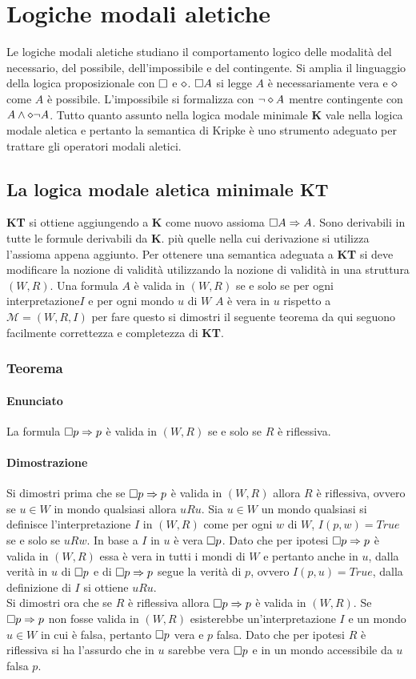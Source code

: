 \chapter{Logiche modali aletiche}
Le logiche modali aletiche studiano il comportamento logico delle modalit\`a del necessario, del possibile, dell'impossibile e del contingente. Si amplia il linguaggio della logica proposizionale con $\Box$ e 
$\diamond$. $\Box A$ si legge $A$ \`e necessariamente vera e $\diamond$ come $A$ \`e possibile. L'impossibile si formalizza con $\neg\diamond A$ mentre contingente con $A\land\diamond\neg A$. Tutto quanto 
assunto nella logica modale minimale \textbf{K} vale nella logica modale aletica e pertanto la semantica di Kripke \`e uno strumento adeguato per trattare gli operatori modali aletici. 
\section{La logica modale aletica minimale \textbf{KT}}
\textbf{KT} si ottiene aggiungendo a \textbf{K} come nuovo assioma $\Box A\Rightarrow A$. Sono derivabili in tutte le formule derivabili da \textbf{K}. pi\`u quelle nella cui derivazione si utilizza l'assioma 
appena aggiunto. Per ottenere una semantica adeguata a \textbf{KT} si deve modificare la nozione di validit\`a utilizzando la nozione di validit\`a in una struttura $(W, R)$. Una formula $A$ \`e valida in $(W, R)$ 
se e solo se per ogni interpretazione$I$ e per ogni mondo $u$ di $W$ $A$ \`e vera in $u$ rispetto a $\mathcal{M}=(W,R,I)$ per fare questo si dimostri il seguente teorema da qui seguono facilmente 
correttezza e completezza di \textbf{KT}.
\subsection{Teorema}
\subsubsection{Enunciato}
La formula $\Box p\Rightarrow p$ \`e valida in $(W, R)$ se e solo se $R$ \`e riflessiva.
\subsubsection{Dimostrazione}
Si dimostri prima che se $\Box p\Rightarrow p$ \`e valida in $(W, R)$ allora $R$ \`e riflessiva, ovvero se $u\in W$ in mondo qualsiasi allora $uRu$. Sia $u\in W$ un mondo qualsiasi si definisce 
l'interpretazione $I$ in $(W, R)$ come per ogni $w$ di $W$, $I(p,w)=True$ se e solo se $uRw$.  In base a $I$ in $u$ \`e vera $\Box p$. Dato che per ipotesi $\Box p\Rightarrow p$ \`e valida in $(W, R)$ essa 
\`e vera in tutti i mondi di $W$ e pertanto anche in $u$, dalla verit\`a in $u$ di $\Box p$ e di $\Box p\Rightarrow p$ segue la verit\`a di $p$, ovvero $I(p, u)=True$, dalla definizione di $I$ si ottiene $uRu$. \\
Si dimostri ora che se $R$ \`e riflessiva allora $\Box p\Rightarrow p$ \`e valida in $(W, R)$. Se $\Box p\Rightarrow p$ non fosse valida in $(W, R)$ esisterebbe un'interpretazione $I$ e un mondo $u\in W$  in
cui \`e falsa, pertanto $\Box p$ vera e $p$ falsa. Dato che per ipotesi $R$ \`e riflessiva si ha l'assurdo che in $u$ sarebbe vera $\Box p$ e in un mondo accessibile da $u$ falsa $p$.
